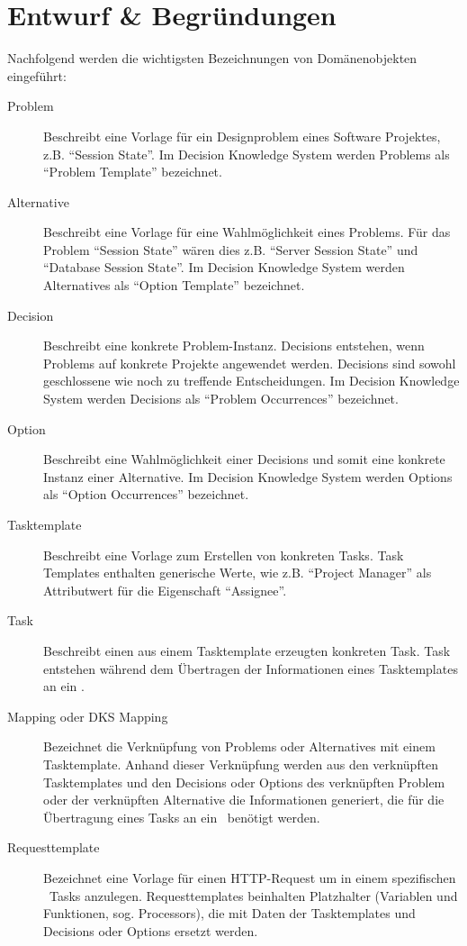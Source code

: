 	\section{Entwurf \& Begründungen}
		Nachfolgend werden die wichtigsten Bezeichnungen von Domänenobjekten eingeführt:
		
		\begin{description}
			\item[Problem] Beschreibt eine Vorlage für ein Designproblem eines Software Projektes, 
				z.B. ``Session State''. 
				Im Decision Knowledge System werden Problems als ``Problem Template'' bezeichnet.
			\item[Alternative] Beschreibt eine Vorlage für eine Wahlmöglichkeit eines Problems.
				Für das Problem ``Session State'' wären dies z.B. ``Server Session State'' und
				``Database Session State''. 
				Im Decision Knowledge System werden Alternatives als ``Option Template'' bezeichnet.
			\item[Decision] Beschreibt eine konkrete Problem-Instanz.
				Decisions entstehen, wenn Problems auf konkrete Projekte angewendet werden.
				Decisions sind sowohl geschlossene wie noch zu treffende Entscheidungen.
				Im Decision Knowledge System werden Decisions als ``Problem Occurrences'' bezeichnet.
			\item[Option] Beschreibt eine Wahlmöglichkeit einer Decisions 
				und somit eine konkrete Instanz einer Alternative.
				Im Decision Knowledge System werden Options als ``Option Occurrences'' bezeichnet.
			\item[Tasktemplate] Beschreibt eine Vorlage zum Erstellen von konkreten Tasks.
				Task Templates enthalten generische Werte, wie z.B. ``Project Manager'' als
				Attributwert für die Eigenschaft ``Assignee''.
			\item[Task] Beschreibt einen aus einem Tasktemplate erzeugten konkreten Task.
				Task entstehen während dem Übertragen der Informationen eines Tasktemplates an ein \ppt.
			\item[Mapping oder DKS Mapping] Bezeichnet die Verknüpfung von Problems oder 
				Alternatives mit einem Tasktemplate. 
				Anhand dieser Verknüpfung werden aus den verknüpften Tasktemplates und den Decisions oder Options des verknüpften Problem oder
				der verknüpften Alternative die Informationen generiert, 
				die für die Übertragung eines Tasks an ein \ppt\ benötigt werden.
			\item[Requesttemplate] Bezeichnet eine Vorlage für einen HTTP-Request um 
				in einem spezifischen \ppt\ Tasks anzulegen.
				Requesttemplates beinhalten Platzhalter (Variablen und Funktionen, sog. Processors),
				die mit Daten der Tasktemplates und Decisions oder Options ersetzt werden. 
		\end{description}	
	
